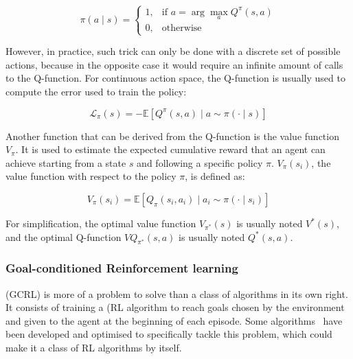 \begin{equation} \label{eq:bg:rl:pi_from_q_function}
    \pi(a \mid s) =
    \begin{cases}
    1, & \text{if } a = \arg\max_a Q^{\pi}(s, a) \\
    0, & \text{otherwise}
    \end{cases}
\end{equation}

However, in practice, such trick can only be done with a discrete set of possible actions, because in the opposite case
it would require an infinite amount of calls to the Q-function.
For continuous action space, the Q-function is usually used to compute the error used to train the policy:

\begin{equation}
    \mathcal{L}_\pi(s) = - \mathbb{E} \left[ Q^{\pi}(s, a) \mid a \sim \pi(\cdot \mid s) \right]
\end{equation}

Another function that can be derived from the Q-function is the value function $V_\pi$.
It is used to estimate the expected cumulative reward that an agent can achieve starting from a state $s$ and
following a specific policy $\pi$.
$V_\pi(s_i)$, the value function with respect to the policy $\pi$, is defined as:

\begin{equation} \label{eq:bg:rl:optimal_value_function}
    V_\pi(s_i) = \mathbb{E} \left[ Q_\pi(s_i, a_i) \mid a_i \sim \pi(\cdot \mid s_i) \right]
\end{equation}

For simplification, the optimal value function $V_{\pi^*}(s)$ is usually noted $V^*(s)$, and the optimal Q-function
$VQ_{\pi^*}(s, a)$ is usually noted $Q^*(s, a)$.

\subsubsection{Goal-conditioned Reinforcement learning}

 (GCRL) is more of a problem to solve than a class of algorithms in its own right.
It consists of training a (RL algorithm to reach goals chosen by the environment and given to
the agent at the beginning of each episode.
Some algorithms~\citep{andrychowicz2017hindsight, nair2018visual} have been developed and optimised to specifically tackle this problem, which could make it a
class of RL algorithms by itself.

